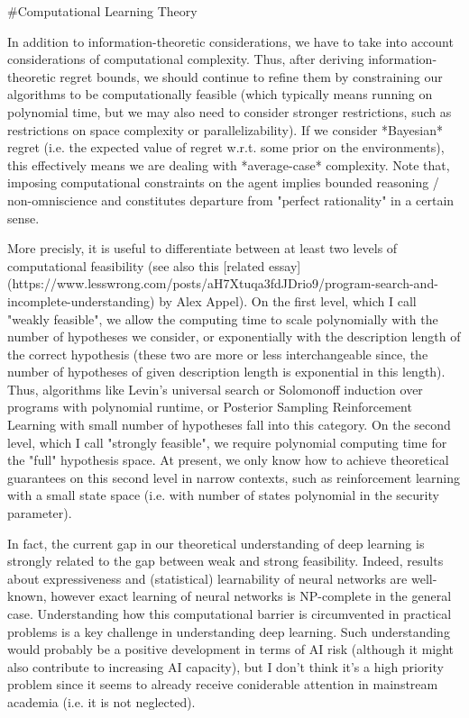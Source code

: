 \documentclass[a4paper]{article}
\begin{document}
\#Computational Learning Theory

In addition to information-theoretic considerations, we have to take into account considerations of computational complexity. Thus, after deriving information-theoretic regret bounds, we should continue to refine them by constraining our algorithms to be computationally feasible (which typically means running on polynomial time, but we may also need to consider stronger restrictions, such as restrictions on space complexity or parallelizability). If we consider *Bayesian* regret (i.e. the expected value of regret w.r.t. some prior on the environments), this effectively means we are dealing with *average-case* complexity. Note that, imposing computational constraints on the agent implies bounded reasoning / non-omniscience and constitutes departure from "perfect rationality" in a certain sense.

More precisly, it is useful to differentiate between at least two levels of computational feasibility (see also this [related essay](https://www.lesswrong.com/posts/aH7Xtuqa3fdJDrio9/program-search-and-incomplete-understanding) by Alex Appel). On the first level, which I call "weakly feasible", we allow the computing time to scale polynomially with the number of hypotheses we consider, or exponentially with the description length of the correct hypothesis (these two are more or less interchangeable since, the number of hypotheses of given description length is exponential in this length). Thus, algorithms like Levin's universal search or Solomonoff induction over programs with polynomial runtime, or Posterior Sampling Reinforcement Learning with small number of hypotheses fall into this category. On the second level, which I call "strongly feasible", we require polynomial computing time for the "full" hypothesis space. At present, we only know how to achieve theoretical guarantees on this second level in narrow contexts, such as reinforcement learning with a small state space (i.e. with number of states polynomial in the security parameter).

In fact, the current gap in our theoretical understanding of deep learning is strongly related to the gap between weak and strong feasibility. Indeed, results about expressiveness and (statistical) learnability of neural networks are well-known, however exact learning of neural networks is NP-complete in the general case. Understanding how this computational barrier is circumvented in practical problems is a key challenge in understanding deep learning. Such understanding would probably be a positive development in terms of AI risk (although it might also contribute to increasing AI capacity), but I don't think it's a high priority problem since it seems to already receive coniderable attention in mainstream academia (i.e. it is not neglected).
\end{document}
